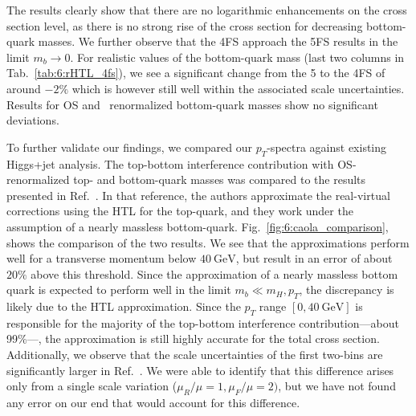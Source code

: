 The results clearly show that there are no logarithmic enhancements on the cross section level, as there is no strong rise of the cross section for decreasing bottom-quark masses. We further observe that the 4\acs{FS} approach the 5\acs{FS} results in the limit $m_b \rightarrow 0$. For realistic values of the bottom-quark mass (last two columns in Tab.~\ref{tab:6:rHTL_4fs}), we see a significant change from the 5 to the 4\acs{FS} of around $-2\%$ which is however still well within the associated scale uncertainties. Results for \acs{OS} and \MS\ renormalized bottom-quark masses show no significant deviations.

To further validate our findings, we compared our $p_T$-spectra against existing Higgs+jet analysis. The top-bottom interference contribution with \acs{OS}-renormalized top- and bottom-quark masses was compared to the results presented in Ref.~\cite{Caola:2018zye}. In that reference, the authors approximate the real-virtual corrections using the \acs{HTL} for the top-quark, and they work under the assumption of a nearly massless bottom-quark. Fig.~\ref{fig:6:caola_comparison}, shows the comparison of the two results. We see that the approximations perform well for a transverse momentum below $40\ \mathrm{GeV}$, but result in an error of about $20\%$ above this threshold. Since the approximation of a nearly massless bottom quark is expected to perform well in the limit $m_b \ll m_H, p_T$, the discrepancy is likely due to the \acs{HTL} approximation. Since the $p_T$ range $[0, 40\ \mathrm{GeV}]$ is responsible for the majority of the top-bottom interference contribution---about 99\%---, the approximation is still highly accurate for the total cross section. Additionally, we observe that the scale uncertainties of the first two-bins are significantly larger in Ref.~\cite{Caola:2018zye}. We were able to identify that this difference arises only from a single scale variation ($\mu_R/\mu = 1, \mu_F/\mu = 2)$, but we have not found any error on our end that would account for this difference.
